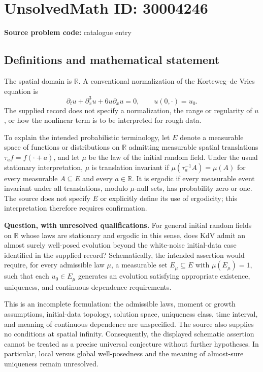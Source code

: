\documentclass[11pt]{article}
\newcommand{\R}{\mathbb{R}}
\begin{document}
\section*{UnsolvedMath ID: 30004246}
\textbf{Source problem code:} catalogue entry
\subsection{Definitions and mathematical statement}
The spatial domain is \(\R\). A conventional normalization of the Korteweg--de Vries equation is
\[
\partial_t u+\partial_x^3u+6u\partial_xu=0,\qquad u(0,\cdot)=u_0.
\]
The supplied record does not specify a normalization, the range or regularity of \(u\), or how the nonlinear term is to be interpreted for rough data.

To explain the intended probabilistic terminology, let \(E\) denote a measurable space of functions or distributions on \(\R\) admitting measurable spatial translations \(\tau_a f=f(\cdot+a)\), and let \(\mu\) be the law of the initial random field. Under the usual stationary interpretation, \(\mu\) is translation invariant if \(\mu(\tau_a^{-1}A)=\mu(A)\) for every measurable \(A\subseteq E\) and every \(a\in\R\). It is ergodic if every measurable event invariant under all translations, modulo \(\mu\)-null sets, has probability zero or one. The source does not specify \(E\) or explicitly define its use of ergodicity; this interpretation therefore requires confirmation.

\textbf{Question, with unresolved qualifications.} For general initial random fields on \(\R\) whose laws are stationary and ergodic in this sense, does KdV admit an almost surely well-posed evolution beyond the white-noise initial-data case identified in the supplied record? Schematically, the intended assertion would require, for every admissible law \(\mu\), a measurable set \(E_\mu\subseteq E\) with \(\mu(E_\mu)=1\), such that each \(u_0\in E_\mu\) generates an evolution satisfying appropriate existence, uniqueness, and continuous-dependence requirements.

This is an incomplete formulation: the admissible laws, moment or growth assumptions, initial-data topology, solution space, uniqueness class, time interval, and meaning of continuous dependence are unspecified. The source also supplies no conditions at spatial infinity. Consequently, the displayed schematic assertion cannot be treated as a precise universal conjecture without further hypotheses. In particular, local versus global well-posedness and the meaning of almost-sure uniqueness remain unresolved.
\end{document}

